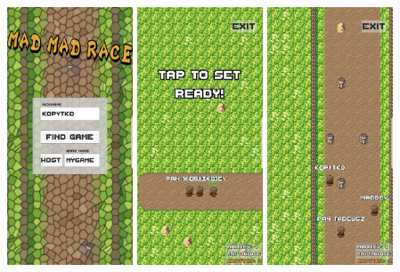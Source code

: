 \documentclass[]{report}
\begin{document}
\begin{center}
	\includegraphics[width=0.28\textwidth]{g1.jpg}
	\hfill
	\includegraphics[width=0.28\textwidth]{g3.jpg}
	\hfill
	\includegraphics[width=0.28\textwidth]{g2.jpg}
\end{center}
\end{document}
